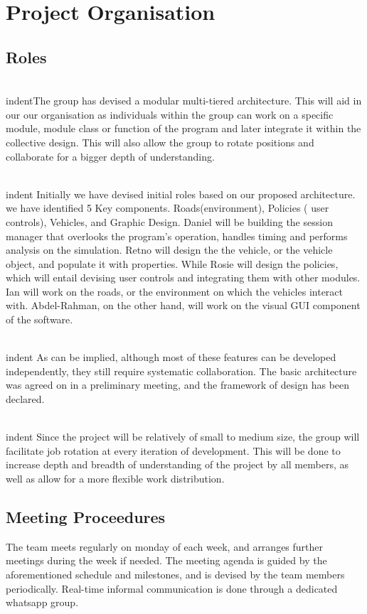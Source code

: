 \documentclass[11pt]{article}
\begin{document}
\section{Project Organisation}
\subsection{Roles}
\\indentThe group has devised a modular multi-tiered architecture. This will aid in our our organisation as individuals within the group can work on a specific module, module class or function of the program and later integrate it within the collective design. This will also allow the group to rotate positions and collaborate for a bigger depth of understanding.

\\indent Initially we have devised initial roles based on our proposed architecture.  we have identified 5 Key components. Roads(environment), Policies ( user controls), Vehicles, and Graphic Design. Daniel will be building the session manager that overlooks the program’s operation, handles timing and performs analysis on the simulation. Retno will design the the vehicle, or the vehicle object, and populate it with properties. While Rosie will design the policies, which will entail devising user controls and integrating them with other modules. Ian will work on the roads, or the environment on which the vehicles interact with. Abdel-Rahman, on the other hand, will work on the visual GUI component of the software.

\\indent As can be implied, although most of these features can be developed independently, they still require systematic collaboration. The basic architecture was agreed on in a preliminary meeting, and the framework of design has been declared.

\\indent Since the project will be relatively of small to medium size, the group will facilitate job rotation at every iteration of development. This will be done to increase depth and breadth of understanding of the project by all members, as well as allow for a more flexible work distribution. 

\subsection{Meeting Proceedures}


The team meets regularly on monday of each week, and arranges further meetings during the week if needed. The meeting agenda is guided by the aforementioned schedule and milestones, and is devised by the team members periodically. Real-time informal communication is done through a dedicated whatsapp group.
\end{document}
